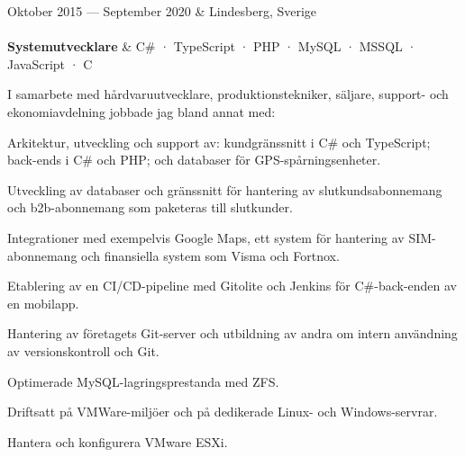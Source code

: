 \documentclass{cv-stylish}
\begin{document}
\begin{center}
\vspace{1em}
\begin{JobTable}
  Oktober 2015 --- September 2020 & \hfill Lindesberg, Sverige \\[3pt]
   \\[3pt]
  \hspace{5mm} \textbf{Systemutvecklare}
  & \hfill C\# · TypeScript · PHP · MySQL · MSSQL · JavaScript · C \\
\end{JobTable}
\begin{adjustwidth}{0.015\linewidth}{0.015\linewidth}
I samarbete med hårdvaruutvecklare, produktionstekniker, säljare,
support- och ekonomiavdelning jobbade jag bland annat med:

\begin{compactitem}
  \item Arkitektur, utveckling och support av: kundgränssnitt i
    C\# och TypeScript; back-ends i C\# och PHP; och databaser för
    GPS-spårningsenheter.
  \item Utveckling av databaser och gränssnitt för hantering av
    slutkundsabonnemang och b2b-abonnemang som paketeras till slutkunder.
  \item Integrationer med exempelvis Google Maps, ett system för hantering
    av SIM-abonnemang och finansiella system som Visma och Fortnox.
  \item Etablering av en CI/CD-pipeline med Gitolite och Jenkins för C\#-back-enden av en mobilapp.
  \item Hantering av företagets Git-server och utbildning av andra om
    intern användning av versionskontroll och Git.
  \item Optimerade MySQL-lagringsprestanda med ZFS.
  \item Driftsatt på VMWare-miljöer och på dedikerade Linux- och
    Windows-servrar.
  \item Hantera och konfigurera VMware ESXi.
\end{compactitem}
\end{adjustwidth}


\end{center}
\end{document}

